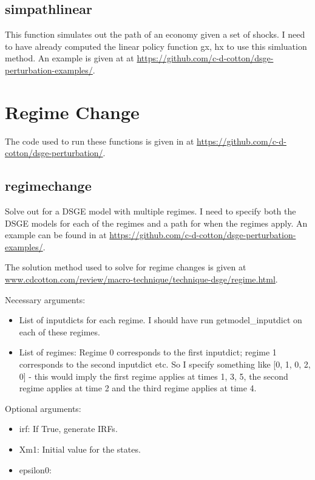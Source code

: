 \documentclass{article}
\theoremstyle{definition}
\begin{document}
\subsection{simpathlinear}
This function simulates out the path of an economy given a set of shocks. I need to have already computed the linear policy function gx, hx to use this simluation method. An example is given at  at \url{https://github.com/c-d-cotton/dsge-perturbation-examples/}.

\section{Regime Change}
The code used to run these functions is given in  at \url{https://github.com/c-d-cotton/dsge-perturbation/}.

\subsection{regimechange}
Solve out for a DSGE model with multiple regimes. I need to specify both the DSGE models for each of the regimes and a path for when the regimes apply. An example can be found in  at \url{https://github.com/c-d-cotton/dsge-perturbation-examples/}.

The solution method used to solve for regime changes is given at \url{www.cdcotton.com/review/macro-technique/technique-dsge/regime.html}.

Necessary arguments:
\begin{itemize}
    \item List of inputdicts for each regime. I should have run getmodel\_inputdict on each of these regimes.
    \item List of regimes: Regime 0 corresponds to the first inputdict; regime 1 corresponds to the second inputdict etc. So I specify something like [0, 1, 0, 2, 0] - this would imply the first regime applies at times 1, 3, 5, the second regime applies at time 2 and the third regime applies at time 4.
\end{itemize}

Optional arguments:
\begin{itemize}
    \item irf: If True, generate IRFs.
    \item Xm1: Initial value for the states.
    \item epsilon0: 
\end{itemize}
\end{document}
